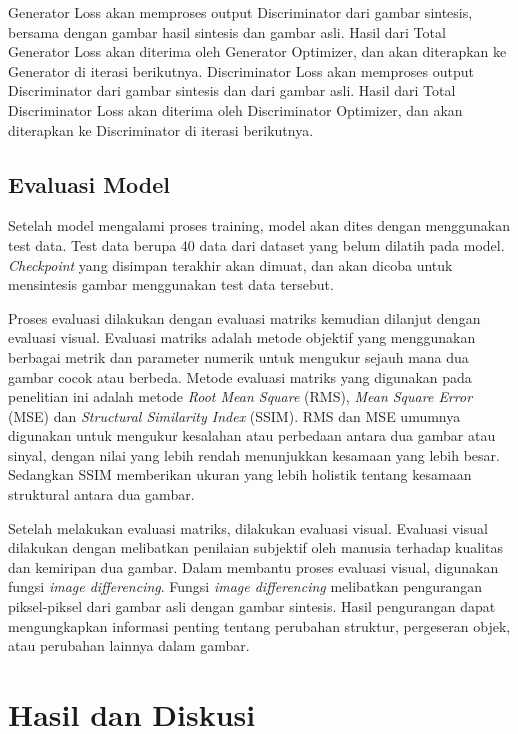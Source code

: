 \documentclass[conference]{IEEEtran}
\begin{document}
Generator Loss akan memproses output Discriminator dari gambar sintesis, bersama dengan gambar hasil sintesis dan gambar asli. 
Hasil dari Total Generator Loss akan diterima oleh Generator Optimizer, dan akan diterapkan ke Generator di iterasi berikutnya. 
Discriminator Loss akan memproses output Discriminator dari gambar sintesis dan dari gambar asli. 
Hasil dari Total Discriminator Loss akan diterima oleh Discriminator Optimizer, dan akan diterapkan ke Discriminator di iterasi berikutnya.

\subsection{Evaluasi Model}
Setelah model mengalami proses training, model akan dites dengan menggunakan test data. 
Test data berupa 40 data dari dataset yang belum dilatih pada model. 
\emph{Checkpoint} yang disimpan terakhir akan dimuat, dan akan dicoba untuk mensintesis gambar menggunakan test data tersebut. 

Proses evaluasi dilakukan dengan evaluasi matriks kemudian dilanjut dengan evaluasi visual. 
Evaluasi matriks adalah metode objektif yang menggunakan berbagai metrik dan parameter numerik untuk mengukur sejauh mana dua gambar cocok atau berbeda. 
Metode evaluasi matriks yang digunakan pada penelitian ini adalah metode \emph{Root Mean Square} (RMS), \emph{Mean Square Error} (MSE) dan \emph{Structural Similarity Index} (SSIM). 
RMS dan MSE umumnya digunakan untuk mengukur kesalahan atau perbedaan antara dua gambar atau sinyal, dengan nilai yang lebih rendah menunjukkan kesamaan yang lebih besar. 
Sedangkan SSIM memberikan ukuran yang lebih holistik tentang kesamaan struktural antara dua gambar.

Setelah melakukan evaluasi matriks, dilakukan evaluasi visual. 
Evaluasi visual dilakukan dengan melibatkan penilaian subjektif oleh manusia terhadap kualitas dan kemiripan dua gambar. 
Dalam membantu proses evaluasi visual, digunakan fungsi \emph{image differencing}. 
Fungsi \emph{image differencing} melibatkan pengurangan piksel-piksel dari gambar asli dengan gambar sintesis. 
Hasil pengurangan dapat mengungkapkan informasi penting tentang perubahan struktur, pergeseran objek, atau perubahan lainnya dalam gambar.

\section{Hasil dan Diskusi}
\end{document}
